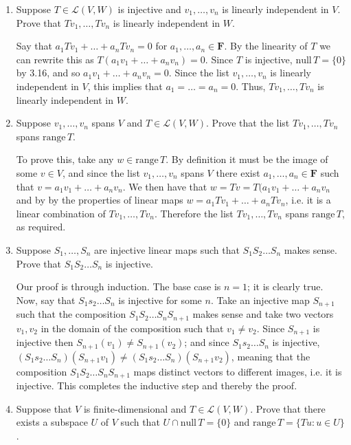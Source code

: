 \documentclass{book}
\begin{document}
\begin{enumerate}
\item Suppose \(T \in \mathcal{L}(V,W)\) is injective and \(v_1,\dots,v_n\) is linearly independent in \(V\).  Prove that \(Tv_1,\dots,Tv_n\) is linearly independent in \(W\).

Say that \(a_1Tv_1+\dots+a_nTv_n=0\) for \(a_1,\dots,a_n \in \textbf{F}\).  By the linearity of \(T\) we can rewrite this as \(T(a_1v_1+\dots+a_nv_n)=0\).  Since \(T\) is injective, \(\textrm{null} \, T=\{0\}\) by 3.16, and so \(a_1v_1+\dots+a_nv_n=0\).  Since the list \(v_1,\dots,v_n\) is linearly independent in \(V\), this implies that \(a_1=\dots=a_n=0\).  Thus, \(Tv_1,\dots,Tv_n\) is linearly independent in \(W\).

\item Suppose \(v_1,\dots,v_n\) spans \(V\) and \(T \in \mathcal{L}(V,W)\).  Prove that the list \(Tv_1,\dots,Tv_n\) spans \(\textrm{range} \, T\).

To prove this, take any \(w \in \textrm{range} \, T\).  By definition it must be the image of some \(v \in V\), and since the list \(v_1,\dots,v_n\) spans \(V\) there exist \(a_1,\dots,a_n \in \textbf{F}\) such that \(v=a_1v_1+\dots+a_nv_n\).  We then have that \(w=Tv=T(a_1v_1+\dots+a_nv_n\) and by by the properties of linear maps \(w=a_1Tv_1+\dots+a_nTv_n\), i.e. it is a linear combination of \(Tv_1,\dots,Tv_n\).  Therefore the list \(Tv_1,\dots,Tv_n\) spans \(\textrm{range} \, T\), as required.

\item Suppose \(S_1,\dots,S_n\) are injective linear maps such that \(S_1S_2\dots S_n\) makes sense.  Prove that \(S_1S_2\dots S_n\) is injective.

Our proof is through induction.  The base case is \(n=1\); it is clearly true.  Now, say that \(S_1s_2\dots S_n\) is injective for some \(n\).  Take an injective map \(S_{n+1}\) such that the composition \(S_1S_2\dots S_nS_{n+1}\) makes sense and take two vectors \(v_1,v_2\) in the domain of the composition such that \(v_1 \neq v_2\).  Since \(S_{n+1}\) is injective then \(S_{n+1}(v_1) \neq S_{n+1}(v_2)\); and since \(S_1s_2\dots S_n\) is injective, \((S_1s_2\dots S_n)(S_{n+1}v_1) \neq (S_1s_2\dots S_n)(S_{n+1}v_2)\), meaning that the composition \(S_1S_2\dots S_nS_{n+1}\) maps distinct vectors to different images, i.e. it is injective.  This completes the inductive step and thereby the proof.

\item Suppose that \(V\) is finite-dimensional and \(T \in \mathcal{L}(V,W)\).  Prove that there exists a subspace \(U\) of \(V\) such that \(U \cap \textrm{null} \, T = \{0\}\) and \(\textrm{range} \, T=\{Tu: u \in U\}\).


\end{enumerate}
\end{document}
